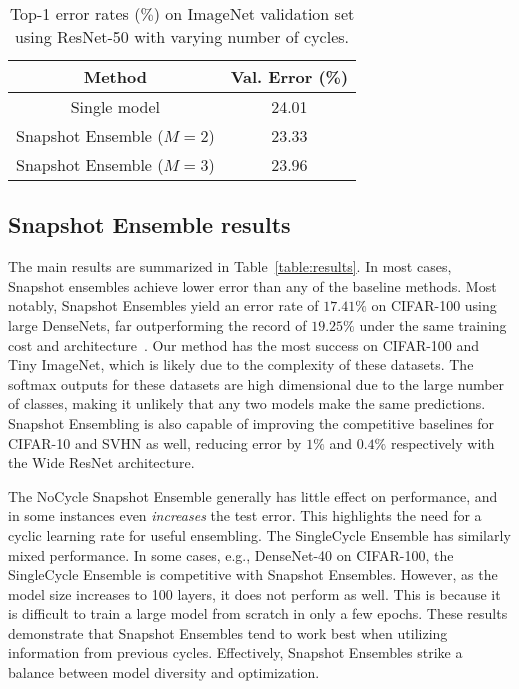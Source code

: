 \begin{wraptable}{r}{0.5\textwidth}
\centering
\small
\begin{tabular}{cc}
\toprule
Method & {\bf Val. Error (\%)} \\
\midrule
Single model & 24.01 \\
Snapshot Ensemble ($M = 2$) & 23.33 \\
Snapshot Ensemble ($M = 3$) & 23.96 \\
\bottomrule
\end{tabular}
\caption[]{\small Top-1 error rates ($\%$) on ImageNet validation set using ResNet-50 with varying number of cycles.}
\label{table:imagenet}
 \end{wraptable}

\subsection{Snapshot Ensemble results}

 The main results are summarized in Table~\ref{table:results}. In most cases, Snapshot ensembles achieve lower error than any of the baseline methods. Most notably, Snapshot Ensembles yield an error rate of $17.41\%$ on CIFAR-100 using large DenseNets, far outperforming the record of $19.25\%$ under the same training cost and architecture~\citep{huang2016densely}. Our method has the most success on CIFAR-100 and Tiny ImageNet, which is likely due to the complexity of these datasets. The softmax outputs for these datasets are high dimensional due to the large number of classes, making it unlikely that any two models make the same predictions. Snapshot Ensembling is also capable of improving the competitive baselines for CIFAR-10 and SVHN as well, reducing error by $1\%$ and $0.4\%$ respectively with the Wide ResNet architecture.

The NoCycle Snapshot Ensemble generally has little effect on performance, and in some instances even \emph{increases} the test error.
This highlights the need for a cyclic learning rate for useful ensembling.
The SingleCycle Ensemble has similarly mixed performance.
In some cases, e.g., DenseNet-40 on CIFAR-100, the SingleCycle Ensemble is competitive with Snapshot Ensembles. However, as the model size increases to 100 layers, it does not perform as well. This is because it is difficult to train a large model from scratch in only a few epochs.
These results demonstrate that Snapshot Ensembles tend to work best when utilizing information from previous cycles.
Effectively, Snapshot Ensembles strike a balance between model diversity and optimization.

